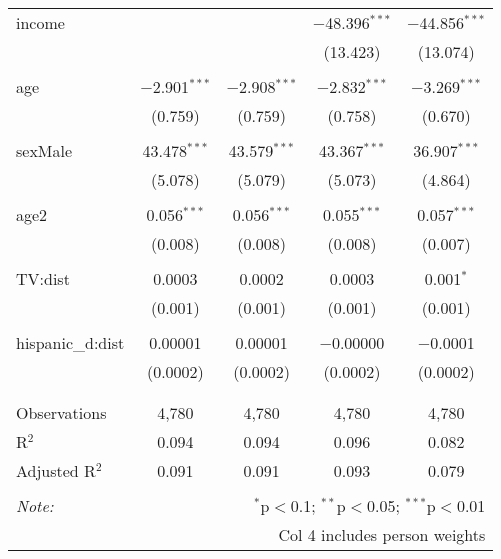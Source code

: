 \begin{table}[!htbp]
\begin{tabular}{@{\extracolsep{-5pt}}lcccc}
 income &  &  & $-$48.396$^{***}$ & $-$44.856$^{***}$ \\ 
  &  &  & (13.423) & (13.074) \\ 
  & & & & \\ 
 age & $-$2.901$^{***}$ & $-$2.908$^{***}$ & $-$2.832$^{***}$ & $-$3.269$^{***}$ \\ 
  & (0.759) & (0.759) & (0.758) & (0.670) \\ 
  & & & & \\ 
 sexMale & 43.478$^{***}$ & 43.579$^{***}$ & 43.367$^{***}$ & 36.907$^{***}$ \\ 
  & (5.078) & (5.079) & (5.073) & (4.864) \\ 
  & & & & \\ 
 age2 & 0.056$^{***}$ & 0.056$^{***}$ & 0.055$^{***}$ & 0.057$^{***}$ \\ 
  & (0.008) & (0.008) & (0.008) & (0.007) \\ 
  & & & & \\ 
 TV:dist & 0.0003 & 0.0002 & 0.0003 & 0.001$^{*}$ \\ 
  & (0.001) & (0.001) & (0.001) & (0.001) \\ 
  & & & & \\ 
 hispanic\_d:dist & 0.00001 & 0.00001 & $-$0.00000 & $-$0.0001 \\ 
  & (0.0002) & (0.0002) & (0.0002) & (0.0002) \\ 
  & & & & \\ 
\hline \\[-1.8ex] 
Observations & 4,780 & 4,780 & 4,780 & 4,780 \\ 
R$^{2}$ & 0.094 & 0.094 & 0.096 & 0.082 \\ 
Adjusted R$^{2}$ & 0.091 & 0.091 & 0.093 & 0.079 \\ 
\hline 
\hline \\[-1.8ex] 
\textit{Note:}  & \multicolumn{4}{r}{$^{*}$p$<$0.1; $^{**}$p$<$0.05; $^{***}$p$<$0.01} \\ 
 & \multicolumn{4}{r}{Col 4 includes person weights} \\ 
\end{tabular} 
\end{table} 
